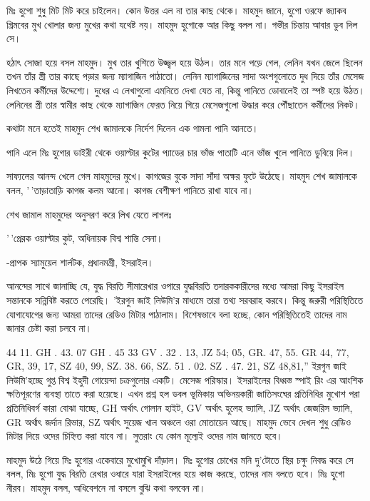 \documentclass[
]{book}
\begin{document}
মিঃ হুগো শুধু মিট মিট করে চাইলেন। কোন উত্তর এল না তার কাছ থেকে। মাহমুদ জানে, হুগো ওরফে জ্যাকব গ্রিমবের মুখ খোলার জন্য মুখের কথা যথেষ্ট নয়। মাহমুদ হুগোকে আর কিছু বলল না। গভীর চিন্তায় আবার ডুব দিল সে।

হঠাৎ সোজা হয়ে বসল মাহমুদ। মুখ তার খুশিতে উজ্জ্বল হয়ে উঠল। তার মনে পড়ে গেল, লেনিন যখন জেলে ছিলেন তখন তাঁর স্ত্রী তার কাছে পড়ার জন্য ম্যাগাজিন পাঠাতো। লেনিন ম্যাগাজিনের সাদা অংশগুলোতে দুধ দিয়ে তাঁর মেসেজ লিখতেন কর্মীদের উদ্দেশ্যে। দুধের এ লেখাগুলো এমনিতে দেখা যেত না, কিন্তু পানিতে ডোবালেই তা স্পষ্ট হয়ে উঠত। লেনিনের স্ত্রী তার স্বামীর কাছ থেকে ম্যাগাজিন ফেরত নিয়ে গিয়ে মেসেজগুলো উদ্ধার করে পৌঁছাতেন কর্মীদের নিকট।

কথাটা মনে হতেই মাহমুদ শেখ জামালকে নির্দেশ দিলেন এক গামলা পানি আনতে।

পানি এলে মিঃ হুগোর ডাইরী থেকে ওয়াল্টার কুটের প্যাডের চার ভাঁজ পাতাটি এনে ভাঁজ খুলে পানিতে ডুবিয়ে দিল।

সাফ্যলের আনন্দ খেলে গেল মাহমুদের মুখে। কাগজের বুকে সাদা সাঁদা অক্ষর ফুটে উঠেছে। মাহমুদ শেখ জামালকে বলল, '\,'তাড়াতাড়ি কাগজ কলম আনো। কাগজ বেশীক্ষণ পানিতে রাখা যাবে না।

শেখ জামাল মাহমুদের অনুসরণ করে লিখ যেতে লাগলঃ

'\,'প্রেরক ওয়াল্টার কুট, অধিনায়ক বিশ্ব শান্তি সেনা।

-প্রাপক স্যামুয়েল শার্লটক, প্রধানমন্ত্রী, ইসরাইল।

আনন্দের সাথে জানাচ্ছি যে, যুদ্ধ বিরতি সীমারেখার ওপারে যুদ্ধবিরতি তদারককারীদের মধ্যে আমরা কিছু ইসরাইল সন্তানকে সন্নিবিষ্ট করতে পেরেছি। 'ইরগুন জাই লিউমি'র মাধ্যমে তারা তথ্য সরবরাহ করবে। কিন্তু জরুরী পরিস্থিতিতে যোগাযোগের জন্য আমরা তাদের রেডিও মিটার পাঠালাম। বিশেষভাবে বলা হচ্ছে, কোন পরিস্থিতিতেই তাদের নাম জানার চেষ্টা করা চলবে না।

44 11. GH . 43. 07 GH . 45 33 GV . 32 . 13, JZ 54; 05, GR. 47, 55. GR 44, 77, GR, 39, 17, SZ 40, 99, SZ. 38. 66, SZ. 51 . 02. SZ . 47. 21, SZ 48,81,''
ইরগুন জাই লিউমি'হচ্ছে গুপ্ত বিশ্ব ইহুদী গোয়েন্দা চক্রগুলোর একটি। মেসেজ পরিস্কার। ইসরাইলের বিধ্বস্ত স্পাই রিং এর আংশিক ক্ষতিপূরণের ব্যবস্থা তাতে করা হয়েছে। এখন প্রশ্ন হল ডবল ভূমিকায় অভিনয়কারী জাতিসংঘের প্রতিনিধির মুখোশ পরা প্রতিনিধিবর্গ কারা বোঝা যাচ্ছে, GH অর্থাৎ গোলান হাইট, GV অর্থাৎ হুলেহ ভ্যালি, JZ অর্থাৎ জেজরিস ভ্যালি, GR অর্থাৎ জর্দান রিভার, SZ অর্থাৎ সুয়েজ খাল অঞ্চলে ওরা মোতায়েন আছে। মাহমুদ ভেবে দেখল শুধু রেডিও মিটার দিয়ে ওদের চিহ্নিত করা যাবে না। সুতরাং যে কোন মূল্যেই ওদের নাম জানতে হবে।

মাহমুদ উঠে গিয়ে মিঃ হুগোর একেবারে মুখোমুখি দাঁড়াল। মিঃ হুগোর চোখের মনি দু'টোতে স্থির চক্ষু নিবদ্ধ করে সে বলল, মিঃ হুগো যুদ্ধ বিরতি রেখার ওধারে যারা ইসরাইলের হয়ে কাজ করছে, তাদের নাম বলতে হবে। মিঃ হুগো নীরব। মাহমুদ বলল, অধিবেশনে না বসলে বুঝি কথা বলবেন না।
\end{document}
